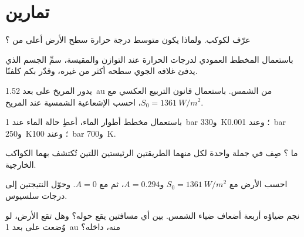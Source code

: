\section{تمارين}

\begin{exercise}[$\star$]\label{exo:g10:habitable-planet:1}
عرّف  لكوكب. ولماذا يكون متوسط درجة حرارة سطح الأرض أعلى من
؟
\end{exercise}

\begin{exercise}[$\star$]\label{exo:g10:habitable-planet:2}
باستعمال المخطط العمودي لدرجات الحرارة عند التوازن والمقيسة، سمِّ الجسم الذي
يدفئ غلافه الجوي سطحه أكثر من غيره، وقدّر بكم
كلفنًا.
\end{exercise}

\begin{exercise}[$\star$]\label{exo:g10:habitable-planet:3}
يدور المريخ على بعد \qty{1.52}{au} من الشمس. باستعمال قانون التربيع العكسي مع
$S_0 = \qty{1361}{W/m^2}$، احسب الإشعاعية الشمسية عند المريخ.
\end{exercise}

\begin{exercise}[$\star$]\label{exo:g10:habitable-planet:4}
باستعمال مخطط أطوار الماء، أعطِ حالة الماء عند \qty{1}{bar}
و\qty{330}{K}؛ وعند \qty{0.001}{bar} و\qty{250}{K}؛ وعند \qty{100}{bar}
و\qty{700}{K}.
\end{exercise}

\begin{exercise}[$\star$]\label{exo:g10:habitable-planet:5}
ما ؟ صِف في جملة واحدة لكل منهما الطريقتين الرئيستين اللتين تُكتشف
بهما الكواكب الخارجية.
\end{exercise}

\begin{exercise}[$\star\star$]\label{exo:g10:habitable-planet:6}
احسب  الأرض مع $S_0 = \qty{1361}{W/m^2}$
و$A = 0.294$، ثم مع $A = 0$. وحوّل النتيجتين إلى درجات سلسيوس.
\end{exercise}

\begin{exercise}[$\star\star$]\label{exo:g10:habitable-planet:7}
نجم ضياؤه أربعة أضعاف ضياء الشمس. بين أي مسافتين يقع 
حوله؟ وهل تقع الأرض، لو وُضعت على بعد \qty{1}{au} منه،
داخله؟
\end{exercise}

